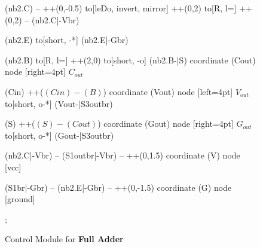 \documentclass[a4paper, 10pt]{article}
\begin{document}
\begin{figure}[!h]
{\begin{circuitikz}[american]
		(nb2.C) -- ++(0,-0.5)
		to[leDo, invert, mirror] ++(0,2)
		to[R, l=\ledResistor] ++(0,2)
		-- (nb2.C|-Vbr)

		(nb2.E) to[short, -*] (nb2.E|-Gbr)

		(nb2.B) to[R, l=\baseResistor] ++(2,0)
		to[short, -o] (nb2.B-|S)
		coordinate (Cout)
		node [right=4pt] {$C_{out}$}

		(Cin) ++($(Cin)-(B)$)
		coordinate (Vout)
		node [left=4pt] {$V_{out}$}
		to[short, o-*] (Vout-|S3outbr)

		(S) ++($(S)-(Cout)$)
		coordinate (Gout)
		node [right=4pt] {$G_{out}$}
		to[short, o-*] (Gout-|S3outbr)

		(nb2.C|-Vbr) -- (S1outbr|-Vbr)
		-- ++(0,1.5)
		coordinate (V)
		node [vcc] {\vccPotential}

		(S1br|-Gbr) -- (nb2.E|-Gbr)
		-- ++(0,-1.5)
		coordinate (G)
		node [ground] {}

		;

	\end{circuitikz}
	}
	\caption{Control Module for \textbf{Full Adder}}
\end{figure}
\end{document}
